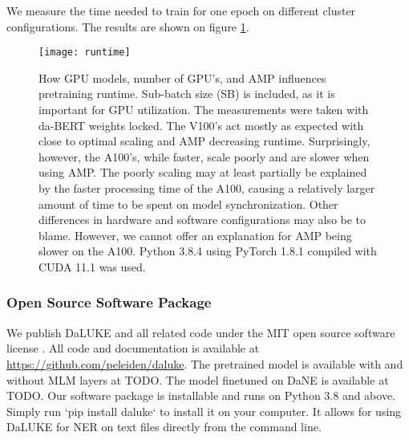 \documentclass[main.tex]{subfiles}
\begin{document}
We measure the time needed to train for one epoch on different cluster configurations.
The results are shown on figure \ref{fig:runtime}.
\begin{figure}[H]
    \centering
    \texttt{[image: runtime]}
    \caption{
        How GPU models, number of GPU's, and AMP influences pretraining runtime.
        Sub-batch size (SB) is included, as it is important for GPU utilization.
        The measurements were taken with da-BERT weights locked.
        The V100's act mostly as expected with close to optimal scaling and AMP decreasing runtime.
        Surprisingly, however, the A100's, while faster, scale poorly and are slower when using AMP.
        The poorly scaling may at least partially be explained by the faster processing time of the A100, causing a relatively larger amount of time to be spent on model synchronization.
        Other differences in hardware and software configurations may also be to blame.
        However, we cannot offer an explanation for AMP being slower on the A100.
        Python 3.8.4 using PyTorch 1.8.1 compiled with CUDA 11.1 was used.
    }
    \label{fig:runtime}
\end{figure}\noindent

\subsubsection{Open Source Software Package}
We publish DaLUKE and all related code under the MIT open source software license \cite{mitlicense}.
All code and documentation is available at \url{https://github.com/peleiden/daluke}.
The pretrained model is available with and without MLM layers at TODO.
The model finetuned on DaNE is available at TODO.
Our software package is  installable and runs on Python 3.8 and above.
Simply run `pip install daluke` to install it on your computer.
It allows for using DaLUKE for NER on text files directly from the command line.
\end{document}
